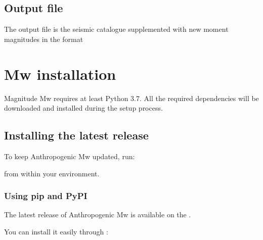 \documentclass[letterpaper,10pt,english]{sphinxmanual}
\begin{document}
\section{Output file}
\label{\detokenize{io_data:output-file}}
\sphinxAtStartPar
The output file is the seismic catalogue supplemented with new moment magnitudes
in the  format

\sphinxstepscope


\chapter{Mw installation}
\label{\detokenize{installation:mw-installation}}\label{\detokenize{installation:installation}}\label{\detokenize{installation::doc}}
\sphinxAtStartPar
Magnitude Mw requires at least Python 3.7. All the required dependencies
will be downloaded and installed during the setup process.


\section{Installing the latest release}
\label{\detokenize{installation:installing-the-latest-release}}
\sphinxAtStartPar
To keep Anthropogenic Mw updated, run:

\begin{sphinxVerbatim}[commandchars=\\\{\}]
   
\end{sphinxVerbatim}

\sphinxAtStartPar
from within your environment.


\subsection{Using pip and PyPI}
\label{\detokenize{installation:using-pip-and-pypi}}
\sphinxAtStartPar
The latest release of Anthropogenic Mw is available on the .

\sphinxAtStartPar
You can install it easily through :

\begin{sphinxVerbatim}[commandchars=\\\{\}]
  
\end{sphinxVerbatim}
\end{document}
